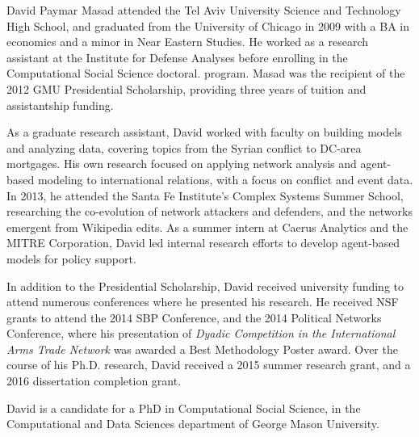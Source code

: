 \documentclass[11 pt]{report}
\begin{document}
%
%

%
%
%

\printbibliography

\cvpage

David Paymar Masad attended the Tel Aviv University Science and Technology High School, and graduated from the University of Chicago in 2009 with a BA in economics and a minor in Near Eastern Studies. He worked as a research assistant at the Institute for Defense Analyses before enrolling in the Computational Social Science doctoral. program. Masad was the recipient of the 2012 GMU Presidential Scholarship, providing three years of tuition and assistantship funding.

As a graduate research assistant, David worked with faculty on building models and analyzing data, covering topics from the Syrian conflict to DC-area mortgages. His own research focused on applying network analysis and agent-based modeling to international relations, with a focus on conflict and event data. In 2013, he attended the Santa Fe Institute's Complex Systems Summer School, researching the co-evolution of network attackers and defenders, and the networks emergent from Wikipedia edits. As a summer intern at Caerus Analytics and the MITRE Corporation, David led internal research efforts to develop agent-based models for policy support.

In addition to the Presidential Scholarship, David received university funding to attend numerous conferences where he presented his research. He received NSF grants to attend the 2014 SBP Conference, and the 2014 Political Networks Conference, where his presentation of \emph{Dyadic Competition in the International Arms Trade Network} was awarded a Best Methodology Poster award. Over the course of his Ph.D. research, David received a 2015 summer research grant, and a 2016 dissertation completion grant.

David is a candidate for a PhD in Computational Social Science, in the Computational and Data Sciences department of George Mason University.
\end{document}
